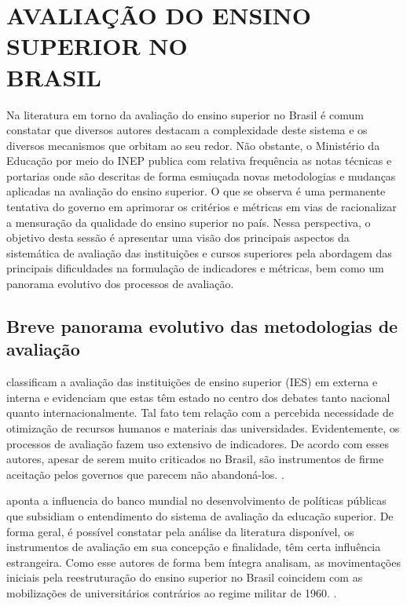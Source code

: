 
\section{AVALIAÇÃO DO ENSINO SUPERIOR NO\\BRASIL}
Na literatura em torno da avaliação do ensino superior no Brasil é comum constatar que diversos autores destacam a complexidade deste sistema e os diversos mecanismos que orbitam ao seu redor. Não obstante, o Ministério da Educação por meio do INEP publica com relativa frequência as notas técnicas e portarias onde são descritas de forma esmiuçada novas metodologias e mudanças aplicadas na avaliação do ensino superior. O que se observa é uma permanente tentativa do governo em aprimorar os critérios e métricas em vias de racionalizar a mensuração da qualidade do ensino superior no país. Nessa perspectiva, o objetivo desta sessão é apresentar uma visão dos principais aspectos da sistemática de avaliação das instituições e cursos superiores pela abordagem das principais dificuldades na formulação de indicadores e métricas, bem como um panorama evolutivo dos processos de avaliação.

\subsection{Breve panorama evolutivo das metodologias de avaliação}
	 classificam a avaliação das instituições de ensino superior (IES) em externa e interna e evidenciam que estas têm estado no centro dos debates tanto nacional quanto internacionalmente. Tal fato tem relação com a percebida necessidade de otimização de recursos humanos e materiais das universidades. Evidentemente, os processos de avaliação fazem uso extensivo de indicadores. De acordo com esses autores, apesar de serem muito criticados no Brasil, são instrumentos de firme aceitação pelos governos que parecem não abandoná-los. .

	 aponta a influencia do banco mundial no desenvolvimento de políticas públicas que subsidiam o entendimento do sistema de avaliação da educação superior. De forma geral, é possível constatar pela análise da literatura disponível, os instrumentos de avaliação em sua concepção e finalidade, têm certa influência estrangeira. Como esse autores de forma bem íntegra analisam, as movimentações iniciais pela reestruturação do ensino superior no Brasil coincidem com as mobilizações de universitários contrários ao regime militar de 1960. .
	\pagebreak

